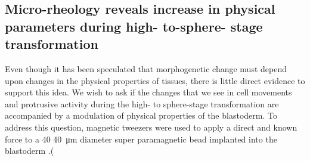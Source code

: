 \subsection{Micro-rheology reveals increase in physical parameters during high- to-sphere- stage transformation}
Even though it has been speculated that morphogenetic change must depend upon changes in the physical properties of tissues, there is little direct evidence to support this idea.
We wish to ask if the changes that we see in cell movements and protrusive activity during the high- to sphere-stage transformation are accompanied by a modulation of physical properties of the blastoderm.
To address this question, magnetic tweezers were used to apply a direct and known force to a 40 \SI{40}{\micro\metre} diameter super paramagnetic bead implanted into the blastoderm \cite{}.(%

